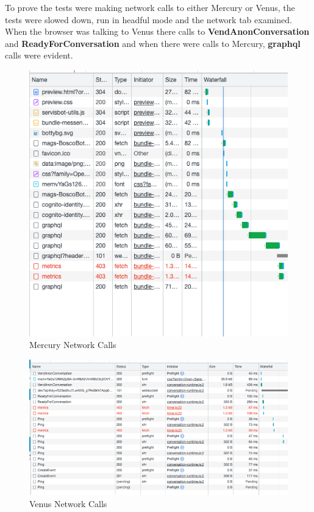 \documentclass[12pt,a4paper,titlepage]{report}
\begin{document}
To prove the tests were making network calls to either Mercury or Venus, the tests were slowed down, run in headful mode and 
the network tab examined. When the browser was talking to Venus there calls to \textbf{VendAnonConversation} and \textbf{ReadyForConversation} and when there were calls to Mercury, \textbf{graphql} calls were evident.

\begin{figure}[H]
 \centering
 \includegraphics[width=15cm]{./diagrams/mercury_network_calls.png}
 \caption{Mercury Network Calls}
\end{figure}

\begin{figure}[H]
 \centering
 \includegraphics[width=15cm]{./diagrams/venus_network_calls.png}
 \caption{Venus Network Calls}
\end{figure}
\end{document}
